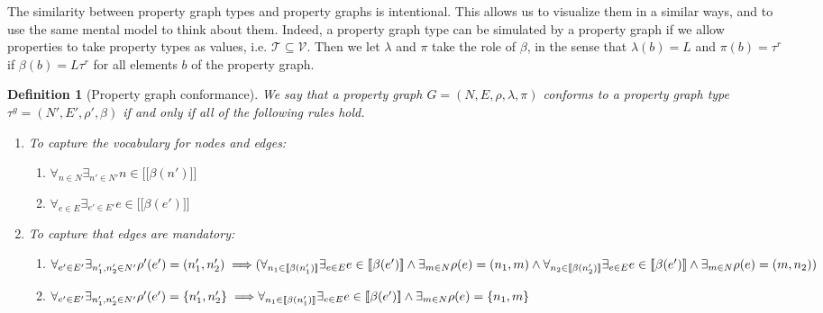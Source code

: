 \documentclass[a4paper]{article}
\newtheorem{definition}[theorem]{Definition}
\newcommand{\ptypes}{\mathcal{T}}
\newcommand{\rtype}{\tau^r}
\newcommand{\gtype}{\tau^g}
\newcommand{\lsem}{\ensuremath{[\![}}
\newcommand{\rsem}{\ensuremath{]\!]}}
\newcommand{\sem}[1]{\ensuremath{\lsem #1 \rsem}}
\begin{document}
The similarity between property graph types and property graphs is intentional. This allows us to visualize them in a similar ways, and to use the same mental model to think about them. Indeed, a property graph type can be simulated by a property graph if we allow properties to take property types as values, i.e. $\ptypes \subseteq \mathcal{V}$. Then we let $\lambda$ and $\pi$ take the role of $\beta$, in the sense that $\lambda(b) = L$ and $\pi(b) = \rtype$ if $\beta(b) = L\rtype$ for all elements $b$ of the property graph.

\begin{definition}[Property graph conformance]
  We say that a property graph $G = (N, E, \rho, \lambda, \pi)$ \emph{conforms} to a property graph type $\gtype = (N', E', \rho', \beta)$ if and only if all of the following rules hold.

  \begin{enumerate}
    \item To capture the vocabulary for nodes and edges:
    \begin{enumerate}
      \item $\forall_{n \in N} \exists_{n' \in N'} n \in \sem{\beta(n')}$
      \item $\forall_{e \in E} \exists_{e' \in E'} e \in \sem{\beta(e')}$
    \end{enumerate}
    \item To capture that edges are mandatory:
    \begin{enumerate}
      \item $\forall_{e' \in E'} \exists_{n'_1, n'_2 \in N'} \rho'(e') = (n'_1, n'_2) \implies
      \\\\(\forall_{n_1 \in \sem{\beta(n'_1)}} \exists_{e \in E} e \in \sem{\beta(e')} \wedge \exists_{m \in N} \rho(e) = (n_1, m) \wedge
      \\\\ \forall_{n_2 \in \sem{\beta(n'_2)}} \exists_{e \in E} e \in \sem{\beta(e')} \wedge \exists_{m \in N} \rho(e) = (m, n_2))$

      \item $\forall_{e' \in E'} \exists_{n'_1, n'_2 \in N'} \rho'(e') = \{n'_1, n'_2\} \implies
      \\\\\forall_{n_1 \in \sem{\beta(n'_1)}} \exists_{e \in E} e \in \sem{\beta(e')} \wedge \exists_{m \in N} \rho(e) = \{n_1, m\}$
    \end{enumerate}
  \end{enumerate}
\end{definition}
\end{document}
